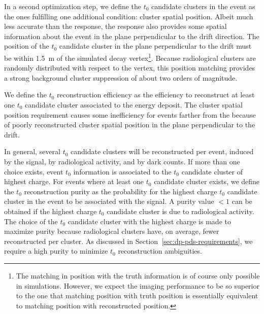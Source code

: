 In a second optimization step, we define the $t_0$ candidate clusters in the event as the ones fulfilling one additional condition: cluster spatial position. Albeit much less accurate than the  response, the  response also provides some spatial information about the event in the plane perpendicular to the drift direction. The position of the $t_0$ candidate cluster in the plane perpendicular to the drift must be within \SI{1.5}{\m} of the simulated  decay vertex\footnote{The matching in position with the  truth information is of course only possible in simulations. However, we expect the  imaging performance to be so superior to the  
one that matching  position with  truth position is essentially equivalent to matching  position with  reconstructed position.}. Because radiological clusters are randomly distributed with respect to the  vertex, this position matching provides a strong background cluster suppression of about two orders of magnitude.

We define the  $t_0$ reconstruction efficiency as the efficiency to reconstruct at least one $t_0$ candidate cluster associated to the  energy deposit. The cluster spatial position requirement causes some inefficiency for events farther from the  because of poorly reconstructed cluster spatial position in the plane perpendicular to the drift.

In general, several $t_0$ candidate clusters will be reconstructed per event, induced by the  signal, by radiological activity, and by  dark counts. If more than one choice exists, event $t_0$ information is associated to the $t_0$ candidate cluster of highest charge. For events where at least one $t_0$ candidate cluster exists, we define the   $t_0$ reconstruction purity as the probability for the highest charge $t_0$ candidate cluster in the event to be associated with the  signal. A purity value $<1$ can be obtained if the highest charge $t_0$ candidate cluster is due to radiological activity. The choice of the $t_0$ candidate cluster with the highest charge is made to maximize purity because radiological clusters have, on average, fewer reconstructed  per cluster. As discussed in Section~\ref{sec:dp-pds-requirements}, we require a high purity to minimize $t_0$ reconstruction ambiguities.
%

